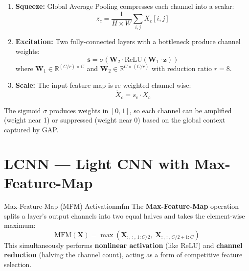 \documentclass[12pt]{report}
\begin{document}
\begin{enumerate}[noitemsep]
    \item \textbf{Squeeze:} Global Average Pooling compresses each channel into a scalar:
          \begin{equation}
              z_c = \frac{1}{H \times W} \sum_{i,j} X_c[i,j]
          \end{equation}
    \item \textbf{Excitation:} Two fully-connected layers with a bottleneck produce channel
          weights:
          \begin{equation}
              \bm{s} = \sigma\!\left(\bm{W}_2 \cdot \text{ReLU}(\bm{W}_1 \cdot \bm{z})\right)
          \end{equation}
          where $\bm{W}_1 \in \mathbb{R}^{(C/r) \times C}$ and $\bm{W}_2 \in \mathbb{R}^{C \times (C/r)}$
          with reduction ratio $r = 8$.
    \item \textbf{Scale:} The input feature map is re-weighted channel-wise:
          \begin{equation}
              \tilde{X}_c = s_c \cdot X_c
          \end{equation}
\end{enumerate}

The sigmoid $\sigma$ produces weights in $[0, 1]$, so each channel can be amplified (weight
near 1) or suppressed (weight near 0) based on the global context captured by GAP.


\section{LCNN --- Light CNN with Max-Feature-Map}

\begin{dfnbox}{Max-Feature-Map (MFM) Activation}{mfm}
    The \textbf{Max-Feature-Map} operation splits a layer's output channels into two equal halves
    and takes the element-wise maximum:
    \begin{equation}
        \text{MFM}(\bm{X}) = \max(\bm{X}_{:,\,:,\,1:C/2}, \;\bm{X}_{:,\,:,\,C/2+1:C})
    \end{equation}
    This simultaneously performs \textbf{nonlinear activation} (like ReLU) and
    \textbf{channel reduction} (halving the channel count), acting as a form of competitive
    feature selection.
\end{dfnbox}
\end{document}
